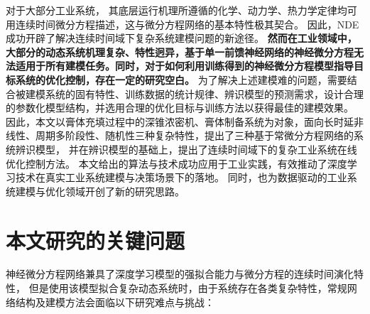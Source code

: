 

对于大部分工业系统，
其底层运行机理所遵循的化学、动力学、热力学定律均可用连续时间微分方程描述，这与微分方程网络的基本特性极其契合。
因此，NDE成功开辟了解决连续时间域下复杂系统建模问题的新途径。
\textbf{然而在工业领域中，大部分的动态系统机理复杂、特性迥异，基于单一前馈神经网络的神经微分方程无法适用于所有建模任务。同时，对于如何利用训练得到的神经微分方程模型指导目标系统的优化控制，存在一定的研究空白。}
为了解决上述建模难的问题，需要结合被建模系统的固有特性、训练数据的统计规律、辨识模型的预测需求，设计合理的参数化模型结构，并选用合理的优化目标与训练方法以获得最佳的建模效果。
因此，本文以膏体充填过程中的深锥浓密机、膏体制备系统为对象，面向长时延非线性、周期多阶段性、随机性三种复杂特性，提出了三种基于常微分方程网络的系统辨识模型，
并在辨识模型的基础上，提出了连续时间域下的复杂工业系统在线优化控制方法。
本文给出的算法与技术成功应用于工业实践，有效推动了深度学习技术在真实工业系统建模与决策场景下的落地。
同时，也为数据驱动的工业系统建模与优化领域开创了新的研究思路。
\section{本文研究的关键问题}
\label{sec:challenge}

神经微分方程网络兼具了深度学习模型的强拟合能力与微分方程的连续时间演化特性，
但是使用该模型拟合复杂动态系统时，由于系统存在各类复杂特性，常规网络结构及建模方法会面临以下研究难点与挑战：
